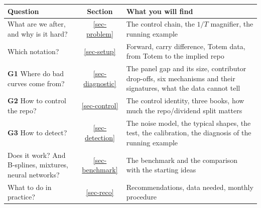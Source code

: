 \begin{center}\small
\begin{tabular}{>{\raggedright\arraybackslash}p{5.1cm}c>{\raggedright\arraybackslash}p{8.0cm}}
\toprule
Question & Section & What you will find\\
\midrule
What are we after, and why is it hard? & \ref{sec-problem} & The control chain, the $1/T$ magnifier, the running
example\\
Which notation? & \ref{sec-setup} & Forward, carry difference, Totem data, from Totem to the implied repo\\
\textbf{G1} Where do bad curves come from? & \ref{sec-diagnostic} & The panel gap and its size, contributor
drop-offs, six mechanisms and their signatures, what the data cannot tell\\
\textbf{G2} How to control the repo? & \ref{sec-control} & The control identity, three books, how much the
repo/dividend split matters\\
\textbf{G3} How to detect? & \ref{sec-detection} & The noise model, the typical shapes, the test, the calibration,
the diagnosis of the running example\\
Does it work? And B-splines, mixtures, neural networks? & \ref{sec-benchmark} & The benchmark and the comparison with
the starting ideas\\
What to do in practice? & \ref{sec-reco} & Recommendations, data needed, monthly procedure\\
\bottomrule
\end{tabular}
\end{center}

{\small\setcounter{tocdepth}{2}\tableofcontents}
\newpage
